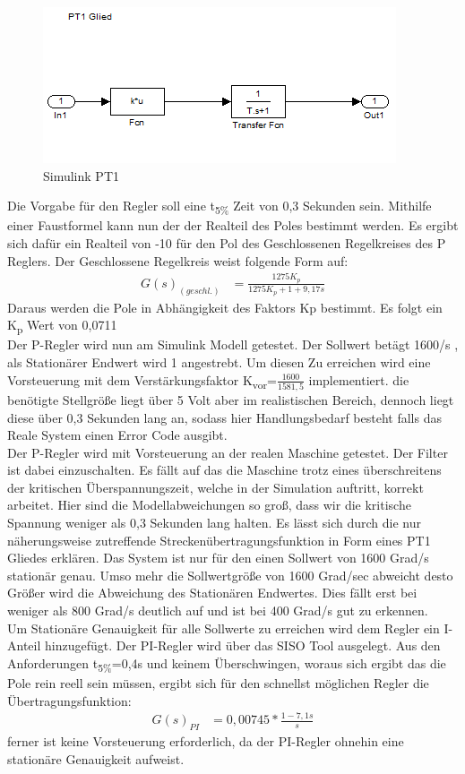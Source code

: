 \documentclass[10pt]{scrartcl}
\begin{document}
\begin{figure}
  \includegraphics[scale=0.51]{Leon-PRT-Bilder/Drehzahl5cklein}
  \caption{Simulink PT1}
\end{figure}
Die Vorgabe für den Regler soll eine t\textsubscript{5\%} Zeit von 0,3 Sekunden sein. Mithilfe einer Faustformel kann nun der der Realteil des Poles bestimmt werden. Es ergibt sich dafür ein Realteil von -10 für den Pol des Geschlossenen Regelkreises des P Reglers. Der Geschlossene Regelkreis weist folgende Form auf: 
\begin{align}
G(s)_{(geschl.)}&=\frac{1275K_p}{1275K_p+ 1+9,17s}
\end{align}
Daraus werden die Pole in Abhängigkeit des Faktors Kp bestimmt. Es folgt ein K\textsubscript{p} Wert von 0,0711 \\
Der P-Regler wird nun am Simulink Modell getestet. Der Sollwert betägt 1600\textdegree/s , als Stationärer Endwert wird 1 angestrebt. Um diesen Zu erreichen wird eine Vorsteuerung mit dem Verstärkungsfaktor  K\textsubscript{vor}=$\frac{1600}{1581,5}$ implementiert.
 die benötigte Stellgröße liegt über 5 Volt aber im realistischen Bereich, dennoch liegt diese über 0,3 Sekunden lang an, sodass hier Handlungsbedarf besteht falls das Reale System einen Error Code ausgibt.\\
Der P-Regler wird mit Vorsteuerung an der realen Maschine getestet. Der Filter ist dabei einzuschalten. Es fällt auf das die Maschine trotz eines überschreitens der kritischen Überspannungszeit, welche in der Simulation auftritt, korrekt arbeitet. Hier sind die Modellabweichungen so groß, dass wir die kritische Spannung weniger als 0,3 Sekunden  lang halten. Es lässt sich durch die nur näherungsweise zutreffende Streckenübertragungsfunktion in Form eines PT1 Gliedes erklären. Das System ist nur für den einen Sollwert von 1600 Grad/s stationär genau. Umso mehr die Sollwertgröße von 1600 Grad/sec abweicht desto Größer wird die Abweichung des Stationären Endwertes. Dies fällt erst bei weniger als 800 Grad/s deutlich auf und ist bei 400 Grad/s gut zu erkennen.\\
Um Stationäre Genauigkeit für alle Sollwerte zu erreichen wird dem Regler ein I-Anteil hinzugefügt. Der PI-Regler wird über das SISO Tool ausgelegt. Aus den Anforderungen t\textsubscript{5\%}=0,4s und keinem Überschwingen, woraus sich ergibt das die Pole rein reell sein müssen, ergibt sich für den schnellst möglichen Regler die Übertragungsfunktion:
\begin{align}
G(s)_{PI}&=0,00745*\frac{1-7,1s}{s}
\end{align}
 ferner ist keine Vorsteuerung erforderlich, da der PI-Regler ohnehin eine stationäre Genauigkeit aufweist. \\
\end{document}
